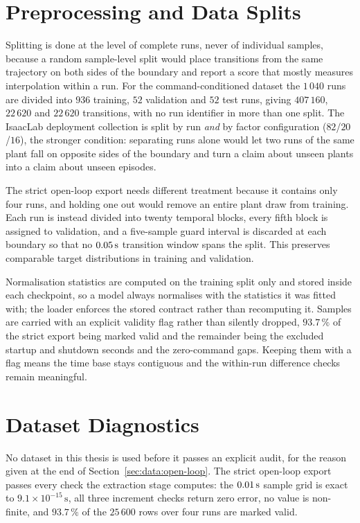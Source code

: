 \section{Preprocessing and Data Splits}
\label{sec:data:preprocessing}

Splitting is done at the level of complete runs, never of individual samples,
because a random sample-level split would place transitions from the same
trajectory on both sides of the boundary and report a score that mostly measures
interpolation within a run. For the command-conditioned dataset the $1\,040$
runs are divided into $936$ training, $52$ validation and $52$ test runs, giving
$407\,160$, $22\,620$ and $22\,620$ transitions, with no run identifier in more
than one split. The IsaacLab deployment collection is split by run \emph{and} by
factor configuration ($82$/$20$/$16$), the stronger condition: separating runs
alone would let two runs of the same plant fall on opposite sides of the
boundary and turn a claim about unseen plants into a claim about unseen
episodes.

The strict open-loop export needs different treatment because it contains only
four runs, and holding one out would remove an entire plant draw from training.
Each run is instead divided into twenty temporal blocks, every fifth block is
assigned to validation, and a five-sample guard interval is discarded at each
boundary so that no $\unit[0.05]{s}$ transition window spans the split. This
preserves comparable target distributions in training and validation.

Normalisation statistics are computed on the training split only and stored
inside each checkpoint, so a model always normalises with the statistics it was
fitted with; the loader enforces the stored contract rather than recomputing it.
Samples are carried with an explicit validity flag rather than silently dropped,
$93.7\,\%$ of the strict export being marked valid and the remainder being the
excluded startup and shutdown seconds and the zero-command gaps. Keeping them
with a flag means the time base stays contiguous and the within-run difference
checks remain meaningful.

\section{Dataset Diagnostics}
\label{sec:data:diagnostics}

No dataset in this thesis is used before it passes an explicit audit,
for the reason given at the end of Section~\ref{sec:data:open-loop}. The strict
open-loop export passes every check the extraction stage computes: the
$\unit[0.01]{s}$ sample grid is exact to $9.1\times10^{-15}\,\mathrm{s}$, all
three increment checks return zero error, no value is non-finite, and
$93.7\,\%$ of the $25\,600$ rows over four runs are marked valid.



